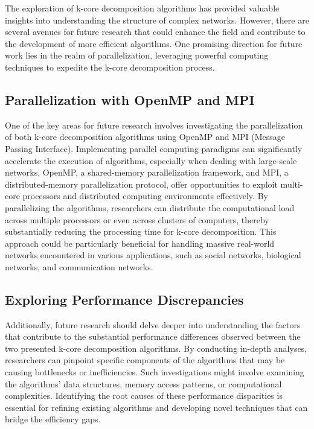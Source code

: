 The exploration of k-core decomposition algorithms has provided valuable insights into understanding the structure of complex networks. However, there are several avenues for future research that could enhance the field and contribute to the development of more efficient algorithms. One promising direction for future work lies in the realm of parallelization, leveraging powerful computing techniques to expedite the k-core decomposition process.

\subsection{Parallelization with OpenMP and MPI}

One of the key areas for future research involves investigating the parallelization of both k-core decomposition algorithms using OpenMP and MPI (Message Passing Interface). Implementing parallel computing paradigms can significantly accelerate the execution of algorithms, especially when dealing with large-scale networks. OpenMP, a shared-memory parallelization framework, and MPI, a distributed-memory parallelization protocol, offer opportunities to exploit multi-core processors and distributed computing environments effectively. By parallelizing the algorithms, researchers can distribute the computational load across multiple processors or even across clusters of computers, thereby substantially reducing the processing time for k-core decomposition. This approach could be particularly beneficial for handling massive real-world networks encountered in various applications, such as social networks, biological networks, and communication networks.

\subsection{Exploring Performance Discrepancies}

Additionally, future research should delve deeper into understanding the factors that contribute to the substantial performance differences observed between the two presented k-core decomposition algorithms. By conducting in-depth analyses, researchers can pinpoint specific components of the algorithms that may be causing bottlenecks or inefficiencies. Such investigations might involve examining the algorithms' data structures, memory access patterns, or computational complexities. Identifying the root causes of these performance disparities is essential for refining existing algorithms and developing novel techniques that can bridge the efficiency gaps.


